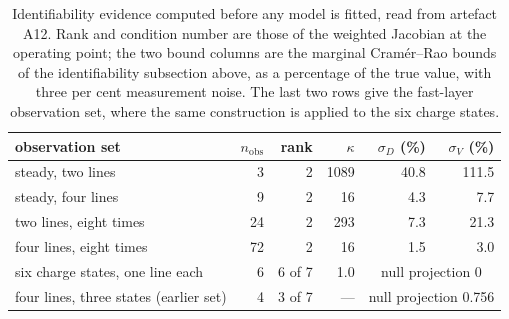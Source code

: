 \begin{table}[htbp]
\centering
\caption{Identifiability evidence computed before any model is fitted, read from artefact A12. Rank and condition number are those of the weighted Jacobian at the operating point; the two bound columns are the marginal Cram\'er--Rao bounds of the identifiability subsection above, as a percentage of the true value, with three per cent measurement noise. The last two rows give the fast-layer observation set, where the same construction is applied to the six charge states.}
\label{tab:ident}
\small
\begin{tabular}{@{}lrrrrr@{}}
\toprule
observation set & $n_{\mathrm{obs}}$ & rank & $\kappa$ & $\sigma_D$ (\%) & $\sigma_V$ (\%) \\
\midrule
steady, two lines & 3 & 2 & 1089 & 40.8 & 111.5 \\
steady, four lines & 9 & 2 & 16 & 4.3 & 7.7 \\
two lines, eight times & 24 & 2 & 293 & 7.3 & 21.3 \\
four lines, eight times & 72 & 2 & 16 & 1.5 & 3.0 \\
\midrule
six charge states, one line each & 6 & 6 of 7 & 1.0 & \multicolumn{2}{c}{null projection 0} \\
four lines, three states (earlier set) & 4 & 3 of 7 & --- & \multicolumn{2}{c}{null projection 0.756} \\
\bottomrule
\end{tabular}
\end{table}
